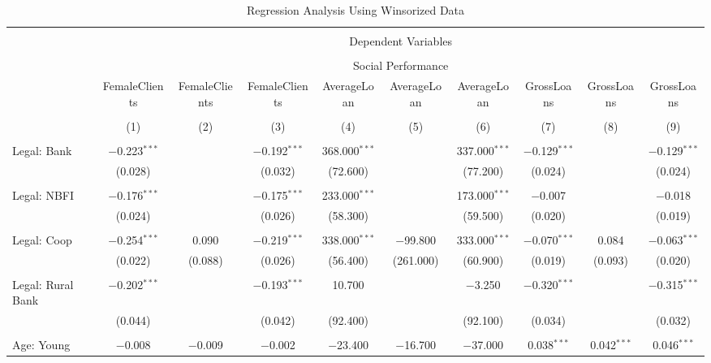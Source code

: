 \documentclass[a4paper, nobind]{templates/ociamthesis}
\begin{document}
\begin{landscape}
\newpage

\begin{table}[!htbp] \centering 
  \caption{Regression Analysis Using Winsorized Data} 
  \label{} 
\tiny 
\begin{tabular}{@{\extracolsep{5pt}}lccccccccc} 
\\[-1.8ex]\hline 
\hline \\[-1.8ex] 
 & \multicolumn{9}{c}{Dependent Variables} \\ 
\cline{2-10} 
\\[-1.8ex] & \multicolumn{9}{c}{Social Performance} \\ 
 & FemaleClients & FemaleClients & FemaleClients & AverageLoan & AverageLoan & AverageLoan & GrossLoans & GrossLoans & GrossLoans \\ 
\\[-1.8ex] & (1) & (2) & (3) & (4) & (5) & (6) & (7) & (8) & (9)\\ 
\hline \\[-1.8ex] 
 Legal: Bank & $-$0.223$^{***}$ &  & $-$0.192$^{***}$ & 368.000$^{***}$ &  & 337.000$^{***}$ & $-$0.129$^{***}$ &  & $-$0.129$^{***}$ \\ 
  & (0.028) &  & (0.032) & (72.600) &  & (77.200) & (0.024) &  & (0.024) \\ 
  & & & & & & & & & \\ 
 Legal: NBFI & $-$0.176$^{***}$ &  & $-$0.175$^{***}$ & 233.000$^{***}$ &  & 173.000$^{***}$ & $-$0.007 &  & $-$0.018 \\ 
  & (0.024) &  & (0.026) & (58.300) &  & (59.500) & (0.020) &  & (0.019) \\ 
  & & & & & & & & & \\ 
 Legal: Coop & $-$0.254$^{***}$ & 0.090 & $-$0.219$^{***}$ & 338.000$^{***}$ & $-$99.800 & 333.000$^{***}$ & $-$0.070$^{***}$ & 0.084 & $-$0.063$^{***}$ \\ 
  & (0.022) & (0.088) & (0.026) & (56.400) & (261.000) & (60.900) & (0.019) & (0.093) & (0.020) \\ 
  & & & & & & & & & \\ 
 Legal: Rural Bank & $-$0.202$^{***}$ &  & $-$0.193$^{***}$ & 10.700 &  & $-$3.250 & $-$0.320$^{***}$ &  & $-$0.315$^{***}$ \\ 
  & (0.044) &  & (0.042) & (92.400) &  & (92.100) & (0.034) &  & (0.032) \\ 
  & & & & & & & & & \\ 
 Age: Young & $-$0.008 & $-$0.009 & $-$0.002 & $-$23.400 & $-$16.700 & $-$37.000 & 0.038$^{***}$ & 0.042$^{***}$ & 0.046$^{***}$ \\ 

\end{tabular}
\end{table}
\end{landscape}
\end{document}
